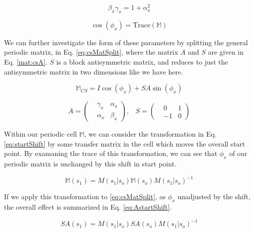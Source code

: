 \begin{equation} \label{eq:csRel}
	\beta_x \gamma_x  = 1 + \alpha_x^2
\end{equation}

\begin{equation} \label{eq:phiTrace}
	\cos{\left(\phi_x\right)} = \mathrm{Trace}(\mathbb{M})
\end{equation}

We can further investigate the form of these parameters by splitting the general periodic matrix, in Eq. \ref{eq:csMatSplit}, where the matrix $A$ and $S$ are given in Eq. \ref{mat:csA}. $S$ is a block antisymmetric matrix, and reduces to just the antisymmetric matrix in two dimensions like we have here.

\begin{equation} \label{eq:csMatSplit}
	\mathbb{M}_{CS} = I \cos{\left(\phi_x\right)} + S A \sin{\left(\phi_x\right)}
\end{equation}

\begin{equation} \label{mat:csA}
	A = 
\begin{pmatrix}
	&\gamma_x &\alpha_x\\
	&\alpha_x &\beta_x
\end{pmatrix},
\hspace{10pt} S =
\begin{pmatrix}
	&0 &1\\
	&-1 &0
\end{pmatrix}
\end{equation}

Within our periodic cell $\mathbb{M}$, we can consider the transformation in Eq. \ref{eq:startShift} by some transfer matrix in the cell which moves the overall start point. By examaning the trace of this transformation, we can see that $\phi_x$ of our periodic matrix is unchanged by this shift in start point.

\begin{equation} \label{eq:startShift}
	\mathbb{M}(s_1)  = M(s_1|s_o)\mathbb{M}(s_o)M(s_1|s_o)^{-1}
\end{equation}

If we apply this transformation to \ref{eq:csMatSplit}, as $\phi_x$ unadjusted by the shift, the overall effect is summarized in Eq. \ref{eq:AstartShift}.

\begin{equation} \label{eq:AstartShift}
	S A(s_1) = M(s_1|s_o) S A(s_o)M(s_1|s_o)^{-1}
\end{equation}

